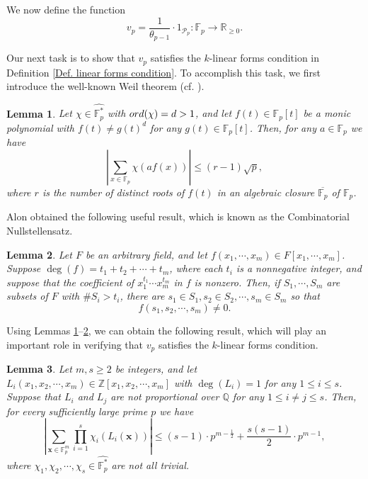 \documentclass[10pt,a4paper]{amsart}
\def\ord{{\rm ord}}
\def\x{{\bm x}}
\newtheorem{lemma}{Lemma}
\begin{document}
	We now define the function 
	\begin{equation}\label{Eq. definition of vp}
		v_p=\frac{1}{\theta_{p-1}}\cdot 1_{\mathcal{P}_p}: \mathbb{F}_p\rightarrow \mathbb{R}_{\ge 0}.
	\end{equation}
	
	Our next task is to show that $v_p$ satisfies the $k$-linear forms condition in Definition \ref{Def. linear forms condition}. To accomplish this task, we first introduce the well-known Weil theorem (cf. \cite[Theorem 5.41]{LN}).
	
	\begin{lemma}\label{Lem. the Weil Bound}
		Let $\chi\in\widehat{\mathbb{F}_p^*}$ with $\ord(\chi)=d>1$, and let $f(t)\in\mathbb{F}_p[t]$ be a monic polynomial with $f(t)\neq g(t)^d$ for any $g(t)\in\mathbb{F}_p[t]$. Then, for any $a\in\mathbb{F}_p$ we have 
		$$\left|\sum_{x\in\mathbb{F}_p}\chi(af(x))\right|\le (r-1)\sqrt{p},$$
		where $r$ is the number of distinct roots of $f(t)$ in an algebraic closure $\overline{\mathbb{F}_p}$ of $\mathbb{F}_p$.
	\end{lemma}
	
	Alon \cite[Theorem 1.2]{A} obtained the following useful result, which is known as the Combinatorial Nullstellensatz.
	
	\begin{lemma}\label{Lem. Alon}
		Let $F$ be an arbitrary field, and let $f(x_1,\cdots,x_m)\in F[x_1,\cdots,x_m]$. Suppose $\deg(f)=t_1+t_2+\cdots+t_m$, where each $t_i$ is a nonnegative integer, and suppose that the coefficient of $x_1^{t_1}\cdots x_m^{t_m}$ in $f$ is nonzero. Then, if $S_1,\cdots,S_m$ are subsets of $F$ with $\#S_i>t_i$, there are $s_1\in S_1, s_2\in S_2,\cdots, s_m\in S_m$ so that 
		$$f(s_1,s_2,\cdots,s_m)\neq 0.$$
	\end{lemma}
	
	Using Lemmas \ref{Lem. the Weil Bound}--\ref{Lem. Alon}, we can obtain the following result, which will play an important role in verifying that $v_p$ satisfies the $k$-linear forms condition.
	

	\begin{lemma}\label{Lem. estimates for nontrival character sums}
		Let $m,s\ge2$ be integers, and let $L_i(x_1,x_2,\cdots,x_m)\in\mathbb{Z}[x_1,x_2,\cdots,x_m]$ with $\deg(L_i)=1$ for any $1\le i\le s$. Suppose  that $L_i$ and $L_j$ are not proportional over $\mathbb{Q}$ for any $1\le i\neq j\le s$. Then, for every sufficiently large prime $p$ we have 
		\begin{equation}\label{Eq. inequality in Lemma estimates for nontrival character sums}
			\left|\sum_{\x\in\mathbb{F}_p^m}\prod_{i=1}^{s}\chi_i(L_i(\x))\right|\le (s-1)\cdot p^{m-\frac{1}{2}}+\frac{s(s-1)}{2}\cdot p^{m-1},
		\end{equation}
		where $\chi_1,\chi_2,\cdots,\chi_s\in\widehat{\mathbb{F}_p^*}$ are not all trivial. 
	\end{lemma}
\end{document}

